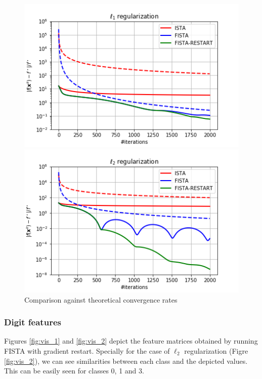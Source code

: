 \documentclass{article}
\begin{document}
\begin{figure}[H]
    \centering
    \begin{minipage}{.45\textwidth}
        \includegraphics[width=\textwidth]{img/l1_reg.png}
    \end{minipage}
    \begin{minipage}{.45\textwidth}
        \includegraphics[width=\textwidth]{img/l2_reg.png}
    \end{minipage}
    \caption{Comparison against theoretical convergence rates}
    \label{fig:theo}
\end{figure}

\subsubsection*{Digit features}
Figures \ref{fig:vis_1} and \ref{fig:vis_2} depict the feature matrices obtained by running FISTA with gradient restart. Specially for the case of $\ell_2$ regularization (Figre \ref{fig:vis_2}), we can see similarities between each class and the depicted values. This can be easily seen for classes 0, 1 and 3.
\end{document}
